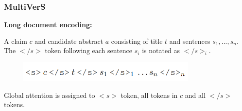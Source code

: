 \documentclass[13.5pt,aspecratio=169, xcolor=dvipsnames]{beamer}
\begin{document}
    \begin{frame}
        \onehalfspacing
        \frametitle{MultiVerS}
        \textbf{Long document encoding:}
        \vspace*{-1em} 
        \begin{mybox}
            A claim $c$ and candidate abstract $a$ consisting of title $t$ and sentences $s_1,...,s_n$. \\
            The $</s>$ token following each sentence $s_i$ is notated as $</s>_i$. 
          \end{mybox}

          \begin{figure}[h]
            \centering
            \includegraphics[width=0.8\textwidth]{Long_document_encoding.png}
          \end{figure}

          \begin{block}{}
            Global attention is assigned  to $<s>$ token, all tokens in $c$ and all $</s>$ tokens.
          \end{block}


    \end{frame}
        
    
\end{document}
